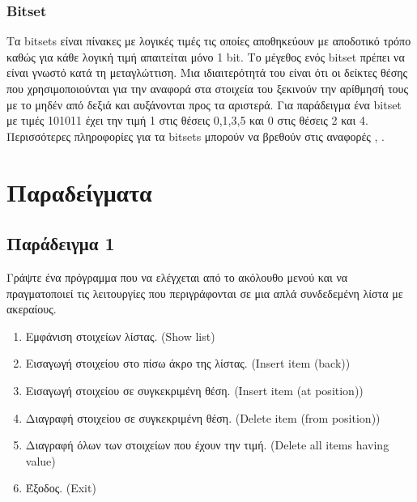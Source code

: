 \subsubsection{Bitset}
Τα bitsets είναι πίνακες με λογικές τιμές τις οποίες αποθηκεύουν με αποδοτικό τρόπο καθώς για κάθε λογική τιμή απαιτείται μόνο 1 bit. Το μέγεθος ενός bitset πρέπει να είναι γνωστό κατά τη μεταγλώττιση. Μια ιδιαιτερότητά του είναι ότι οι δείκτες θέσης που χρησιμοποιούνται για την αναφορά στα στοιχεία του ξεκινούν την αρίθμησή τους με το μηδέν από δεξιά και αυξάνονται προς τα αριστερά. Για παράδειγμα ένα bitset με τιμές 101011 έχει την τιμή 1 στις θέσεις 0,1,3,5 και 0 στις θέσεις 2 και 4. Περισσότερες πληροφορίες για τα bitsets μπορούν να βρεθούν στις αναφορές \cite{g4gbitset1}, \cite{g4gbitset2}.


\section{Παραδείγματα}
\subsection{Παράδειγμα 1}
Γράψτε ένα πρόγραμμα που να ελέγχεται από το ακόλουθο μενού και να πραγματοποιεί τις λειτουργίες που περιγράφονται σε μια απλά συνδεδεμένη λίστα με ακεραίους.
\begin{enumerate}[nolistsep]
\item Εμφάνιση στοιχείων λίστας. (Show list)
\item Εισαγωγή στοιχείου στο πίσω άκρο της λίστας. (Insert item (back))
\item Εισαγωγή στοιχείου σε συγκεκριμένη θέση. (Insert item (at position)) 
\item Διαγραφή στοιχείου σε συγκεκριμένη θέση. (Delete item (from position))
\item Διαγραφή όλων των στοιχείων που έχουν την τιμή. (Delete all items having value)
\item Έξοδος. (Exit)
\end{enumerate}






